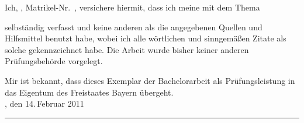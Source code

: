 ﻿
\small
Ich, \autor, Matrikel-Nr.\ \matrikelnr, versichere hiermit, dass ich meine \art{} mit dem Thema
\begin{quote}
\textit{\titel}
\end{quote}
selbständig verfasst und keine anderen als die angegebenen Quellen und Hilfsmittel benutzt habe, wobei ich alle wörtlichen und sinngemäßen Zitate als solche gekennzeichnet habe. Die Arbeit wurde bisher keiner anderen Prüfungsbehörde vorgelegt.

Mir ist bekannt, dass dieses Exemplar der Bachelorarbeit als Prüfungsleistung in das Eigentum des Freistaates Bayern übergeht.\\[1ex]

\ort, den 14.\,Februar 2011\\[2.5ex]

\rule[-0.2cm]{5cm}{0.5pt}

\textsc{\autor} 
\normalsize